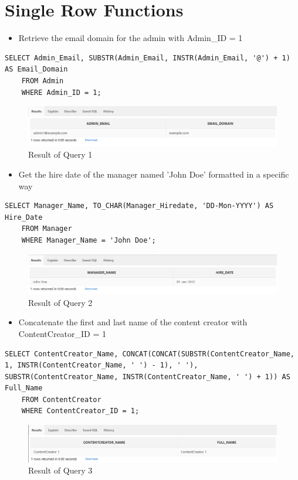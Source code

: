 \clearpage
\section[Single Row Functions]{Single Row Functions}
\hrulefill
\begin{itemize}
    \item Retrieve the email domain for the admin with Admin\_ID = 1
\end{itemize}

\begin{lstlisting}[caption={ Query 1},label={lst:q-1}]
    SELECT Admin_Email, SUBSTR(Admin_Email, INSTR(Admin_Email, '@') + 1) AS Email_Domain
    FROM Admin
    WHERE Admin_ID = 1;
\end{lstlisting}

\begin{figure}[H]
    \centering
    \includegraphics[width=1\textwidth]{images/dml/SingleRaw/Q1.png}
    \caption{Result of Query 1}
\end{figure}

\begin{itemize}
    \item Get the hire date of the manager named 'John Doe' formatted in a specific way
\end{itemize}
\begin{lstlisting}[caption={ Query 2},label={lst:q-2}]
    SELECT Manager_Name, TO_CHAR(Manager_Hiredate, 'DD-Mon-YYYY') AS Hire_Date
    FROM Manager
    WHERE Manager_Name = 'John Doe';
\end{lstlisting}

\begin{figure}[H]
    \centering
    \includegraphics[width=1\textwidth]{images/dml/SingleRaw/Q2.png}
    \caption{Result of Query 2}
\end{figure}

\begin{itemize}
    \item Concatenate the first and last name of the content creator with ContentCreator\_ID = 1
\end{itemize}
\begin{lstlisting}[caption={ Query 3},label={lst:q-3}]
    SELECT ContentCreator_Name, CONCAT(CONCAT(SUBSTR(ContentCreator_Name, 1, INSTR(ContentCreator_Name, ' ') - 1), ' '), SUBSTR(ContentCreator_Name, INSTR(ContentCreator_Name, ' ') + 1)) AS Full_Name
    FROM ContentCreator
    WHERE ContentCreator_ID = 1;
\end{lstlisting}

\begin{figure}[H]
    \centering
    \includegraphics[width=1\textwidth]{images/dml/SingleRaw/Q3.png}
    \caption{Result of Query 3}
\end{figure}

